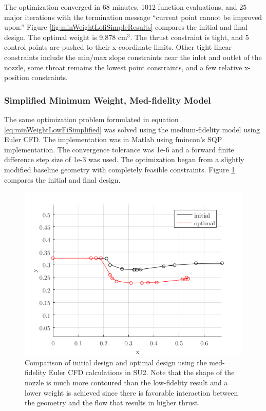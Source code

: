 \documentclass{article}
\begin{document}
The optimization converged in 68 minutes, 1012 function evaluations, and 25 major iterations with the termination message ``current point cannot be improved upon.'' Figure \ref{fig:minWeightLofiSimpleResults} compares the initial and final design. The optimal weight is 9,878 $\textrm{cm}^3$. The thrust constraint is tight, and 5 control points are pushed to their x-coordinate limits. Other tight linear constraints include the min/max slope constraints near the inlet and outlet of the nozzle, some throat remains the lowest point constraints, and a few relative x-position constraints.

\subsubsection{Simplified Minimum Weight, Med-fidelity Model}

The same optimization problem formulated in equation \ref{eq:minWeightLowFiSimplified} was solved using the medium-fidelity model using Euler CFD. The implementation was in Matlab using fmincon's SQP implementation. The convergence tolerance was 1e-6 and a forward finite difference step size of 1e-3 was used. The optimization began from a slightly modified baseline geometry with completely feasible constraints. Figure \ref{fig:minWeightMedfiSimpleResults} compares the initial and final design.

\begin{figure}
\caption{Comparison of initial design and optimal design using the med-fidelity Euler CFD calculations in SU2. Note that the shape of the nozzle is much more contoured than the low-fidelity result and a lower weight is achieved since there is favorable interaction between the geometry and the flow that results in higher thrust.}
\label{fig:minWeightMedfiSimpleResults}
\begin{center}
\includegraphics[scale=0.5]{figs/det_medfi_result.png}
\end{center}
\end{figure}
\end{document}
